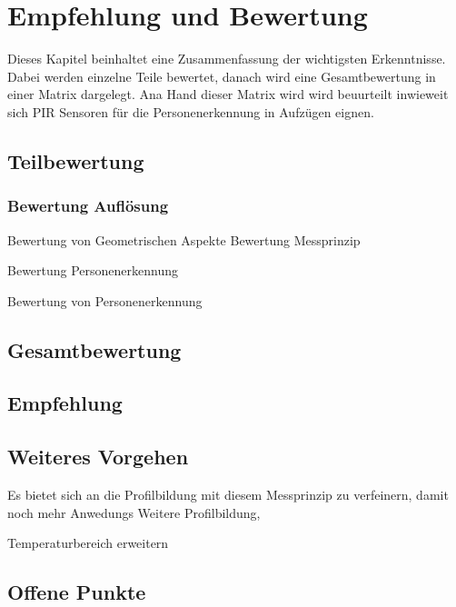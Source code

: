 \chapter{Empfehlung und Bewertung}
\label{Empfehlung_Vorgehen}

Dieses Kapitel beinhaltet eine Zusammenfassung der wichtigsten Erkenntnisse. Dabei werden einzelne Teile bewertet, danach wird eine Gesamtbewertung in einer Matrix dargelegt. Ana Hand dieser Matrix wird wird beuurteilt inwieweit sich PIR Sensoren für die Personenerkennung in Aufzügen eignen. 

\section{Teilbewertung}
\label{sec:Teilbewertung}



\subsection{Bewertung Auflösung}

Bewertung von Geometrischen Aspekte
Bewertung Messprinzip

Bewertung Personenerkennung

Bewertung von Personenerkennung

\section{Gesamtbewertung}
\label{sec:Gesamtbewetung}




\section{Empfehlung}
\label{sec:Empfehlung}



\section{Weiteres Vorgehen}

Es bietet sich an die Profilbildung mit diesem Messprinzip zu verfeinern, damit noch mehr Anwedungs
Weitere Profilbildung, 

Temperaturbereich erweitern

\section{Offene Punkte}

